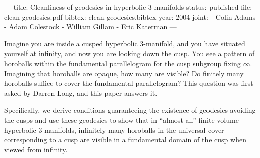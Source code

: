 ---
title: Cleanliness of geodesics in hyperbolic 3-manifolds
status: published
file: clean-geodesics.pdf
bibtex: clean-geodesics.bibtex
year: 2004
joint:
  - Colin Adams
  - Adam Colestock
  - William Gillam
  - Eric Katerman
---

Imagine you are inside a cusped hyperbolic 3-manifold, and you have situated yourself at infinity, and now you are looking down the cusp.  You see a pattern of horoballs within the fundamental parallelogram for the cusp subgroup fixing $\infty$.  Imagining that horoballs are opaque, how many are visible?  Do finitely many horoballs suffice to cover the fundamental parallelogram?  This question was first asked by Darren Long, and this paper answers it.

Specifically, we derive conditions guaranteeing the existence of geodesics avoiding the cusps and use these geodesics to show that in ``almost all'' finite volume hyperbolic 3-manifolds, infinitely many horoballs in the universal cover corresponding to a cusp are visible in a fundamental domain of the cusp when viewed from infinity.
